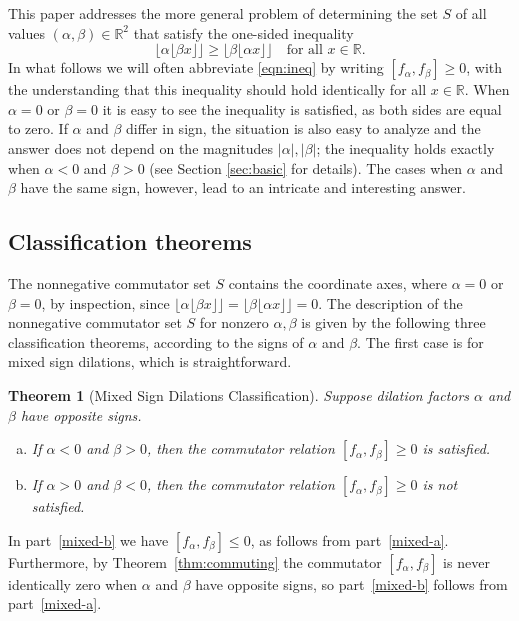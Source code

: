 \documentclass[11pt, letterpaper, reqno]{amsart}
\newtheorem{thm}{Theorem}[section]
\theoremstyle{definition}
\numberwithin{equation}{section}
\newcommand{\RR}{\ensuremath{\mathbb{R}}}
\newcommand{\floor}[1]{\lfloor{#1}\rfloor}
\begin{document}
This paper addresses the more general problem of determining the set $S$ of all values
 $(\alpha,\beta) \in \RR^2$ that satisfy the one-sided inequality 
\begin{equation}\label{eqn:ineq} 
\floor{\alpha \floor{\beta x}} \geq \floor{\beta \floor{\alpha x}} \quad\text{for all }x\in\RR.
\end{equation}
In what follows we will often
abbreviate \eqref{eqn:ineq} by writing $[f_\alpha, f_\beta] \geq 0$, 
with the understanding that this inequality should hold identically for all $x\in\RR$.
When $\alpha = 0$ or $\beta = 0$ it is easy to see the inequality  is satisfied, 
as both sides are equal to zero.
If $\alpha $ and $\beta $ differ in sign, the situation is also easy to analyze and
the answer does not depend on the magnitudes $|\alpha|, |\beta|$; 
the inequality holds exactly when $\alpha<0$ and $\beta>0$
(see Section \ref{sec:basic} for details).
The cases when $\alpha$ and $\beta$ have the same sign, however, lead to an intricate and interesting answer.



%
%

\subsection{Classification theorems}

The nonnegative commutator set $S$ contains the coordinate axes, where $\alpha=0$ or $\beta=0$,
by inspection, since  $\floor{\alpha \floor{\beta x}}=\floor{\beta \floor{\alpha x}} = 0.$
 The description of the nonnegative commutator set $S$ for nonzero $\alpha, \beta$ 
is given by the following three classification theorems, according to the signs of
$\alpha$ and $\beta$.
The first case is for mixed sign dilations, which  is  straightforward.


\begin{thm}[Mixed Sign Dilations Classification]
\label{thm:mixed-sign}
Suppose dilation factors $\alpha$ and $\beta$ have opposite signs.
\begin{enumerate}[(a)]
\item
\label{mixed-a}
 If $\alpha < 0$ and $\beta > 0$, then the commutator relation $[f_{\alpha}, f_\beta]\geq 0$ 
is  satisfied.
\item
\label{mixed-b}
 If $\alpha > 0$ and $\beta < 0$, then the commutator relation $[f_\alpha, f_{\beta}]\geq 0$ 
is not satisfied.
\end{enumerate}
\end{thm}
In part~\eqref{mixed-b} we have $[f_\alpha,f_\beta]\leq 0$,
as follows from part~\eqref{mixed-a}.
Furthermore, by Theorem~\ref{thm:commuting} the commutator $[f_\alpha,f_\beta]$
is never identically zero when $\alpha$ and $\beta$ have opposite signs,
so part~\eqref{mixed-b} follows from part~\eqref{mixed-a}.
\end{document}
